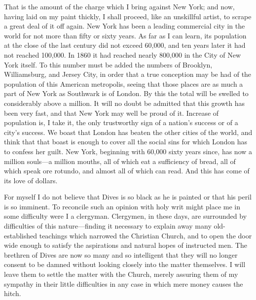 That is the amount of the charge which I bring against New York;
and now, having laid on my paint thickly, I shall proceed, like an
unskillful artist, to scrape a great deal of it off again.  New
York has been a leading commercial city in the world for not more
than fifty or sixty years.  As far as I can learn, its population
at the close of the last century did not exceed 60,000, and ten
years later it had not reached 100,000.  In 1860 it had reached
nearly 800,000 in the City of New York itself.  To this number must
be added the numbers of Brooklyn, Williamsburg, and Jersey City, in
order that a true conception may be had of the population of this
American metropolis, seeing that those places are as much a part of
New York as Southwark is of London.  By this the total will be
swelled to considerably above a million.  It will no doubt be
admitted that this growth has been very fast, and that New York may
well be proud of it.  Increase of population is, I take it, the
only trustworthy sign of a nation's success or of a city's success.
We boast that London has beaten the other cities of the world, and
think that that boast is enough to cover all the social sins for
which London has to confess her guilt.  New York, beginning with
60,000 sixty years since, has now a million souls---a million
mouths, all of which eat a sufficiency of bread, all of which speak
ore rotundo, and almost all of which can read.  And this has come
of its love of dollars.

For myself I do not believe that Dives is so black as he is painted
or that his peril is so imminent.  To reconcile such an opinion
with holy writ might place me in some difficulty were I a
clergyman.  Clergymen, in these days, are surrounded by
difficulties of this nature---finding it necessary to explain away
many old-established teachings which narrowed the Christian Church,
and to open the door wide enough to satisfy the aspirations and
natural hopes of instructed men.  The brethren of Dives are now so
many and so intelligent that they will no longer consent to be
damned without looking closely into the matter themselves.  I will
leave them to settle the matter with the Church, merely assuring
them of my sympathy in their little difficulties in any case in
which mere money causes the hitch.

